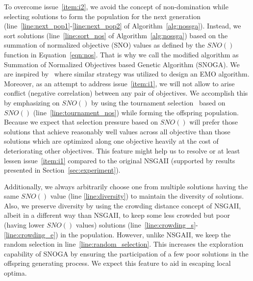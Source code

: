 To overcome issue~\ref{item:i2}, we avoid the concept of non-domination while selecting solutions to form the population for the next generation (line~\ref{line:next_pop1}-\ref{line:next_pop2} of Algorithm~\ref{alg:nossga}). Instead, we sort solutions (line~\ref{line:sort_nos} of Algorithm~\ref{alg:nossga}) based on the summation of normalized objective (SNO) values as defined by the $SNO()$ function in Equation~\ref{eqn:nos}. That is why we call the modified algorithm as Summation of Normalized Objectives based Genetic Algorithm (SNOGA). We are inspired by~\cite{qu2010multi} where  similar strategy was utilized to design an EMO algorithm. Moreover, as an attempt to address issue~\ref{item:i1}, we will not allow to arise conflict (negative correlation) between any pair of objectives. We accomplish this by emphasizing on $SNO()$ by using the tournament selection~\cite{goldberg1991comparative} based on $SNO()$ (line~\ref{line:tournament_nos}) while forming the offspring population.
Because we expect that selection pressure based on $SNO()$ will prefer those solutions that achieve reasonably well values across all objective than those solutions which are optimized along one objective heavily at the cost of deteriorating other objectives. This feature might help us to resolve or at least lessen issue~\ref{item:i1} compared to the original NSGAII (supported by results presented in Section~\ref{sec:experiment}). %

Additionally, we always arbitrarily choose one from multiple solutions having the same $SNO()$ value (line \ref{line:diversity}) to maintain the diversity of solutions. Also, we preserve diversity by using the crowding distance concept of NSGAII, albeit in a different way than NSGAII, to keep some less crowded but poor (having lower $SNO()$ values) solutions (line~\ref{line:crowding_s}-\ref{line:crowding_e}) in the population. However, unlike NSGAII, we keep the random selection in line~\ref{line:random_selection}. This increases the exploration capability of SNOGA by ensuring the participation of a few poor solutions in the offspring generating process. We expect this feature to aid in escaping local optima.



